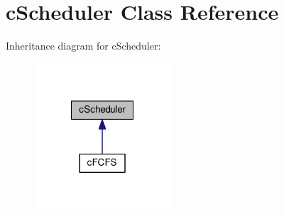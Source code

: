 \hypertarget{classcScheduler}{\section{c\-Scheduler \-Class \-Reference}
\label{d0/d21/classcScheduler}
}


\-Inheritance diagram for c\-Scheduler\-:\nopagebreak
\begin{figure}[H]
\begin{center}
\leavevmode
\includegraphics[width=144pt]{d8/dde/classcScheduler__inherit__graph}
\end{center}
\end{figure}
